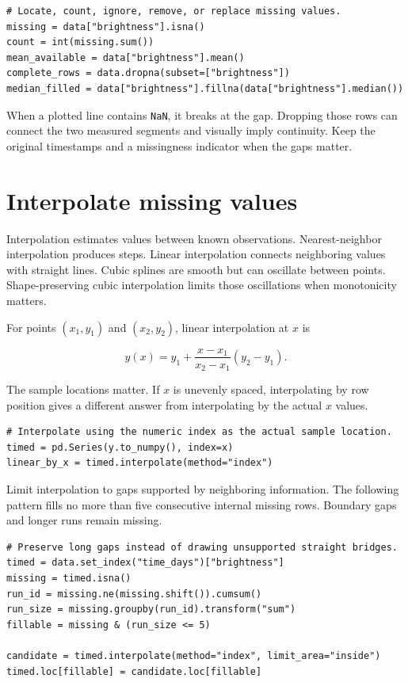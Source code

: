 \documentclass[11pt,letterpaper]{article}
\begin{document}
\begin{lstlisting}
# Locate, count, ignore, remove, or replace missing values.
missing = data["brightness"].isna()
count = int(missing.sum())
mean_available = data["brightness"].mean()
complete_rows = data.dropna(subset=["brightness"])
median_filled = data["brightness"].fillna(data["brightness"].median())
\end{lstlisting}

When a plotted line contains \texttt{NaN}, it breaks at the gap. Dropping those
rows can connect the two measured segments and visually imply continuity. Keep
the original timestamps and a missingness indicator when the gaps matter.

\section{Interpolate missing values}

Interpolation estimates values between known observations. Nearest-neighbor
interpolation produces steps. Linear interpolation connects neighboring values
with straight lines. Cubic splines are smooth but can oscillate between points.
Shape-preserving cubic interpolation limits those oscillations when monotonicity
matters.

For points $(x_1,y_1)$ and $(x_2,y_2)$, linear interpolation at $x$ is

\[
  y(x) = y_1 + \frac{x-x_1}{x_2-x_1}(y_2-y_1).
\]

The sample locations matter. If $x$ is unevenly spaced, interpolating by row
position gives a different answer from interpolating by the actual $x$ values.

\begin{lstlisting}
# Interpolate using the numeric index as the actual sample location.
timed = pd.Series(y.to_numpy(), index=x)
linear_by_x = timed.interpolate(method="index")
\end{lstlisting}

Limit interpolation to gaps supported by neighboring information. The following
pattern fills no more than five consecutive internal missing rows. Boundary
gaps and longer runs remain missing.

\begin{lstlisting}
# Preserve long gaps instead of drawing unsupported straight bridges.
timed = data.set_index("time_days")["brightness"]
missing = timed.isna()
run_id = missing.ne(missing.shift()).cumsum()
run_size = missing.groupby(run_id).transform("sum")
fillable = missing & (run_size <= 5)

candidate = timed.interpolate(method="index", limit_area="inside")
timed.loc[fillable] = candidate.loc[fillable]
\end{lstlisting}
\end{document}
